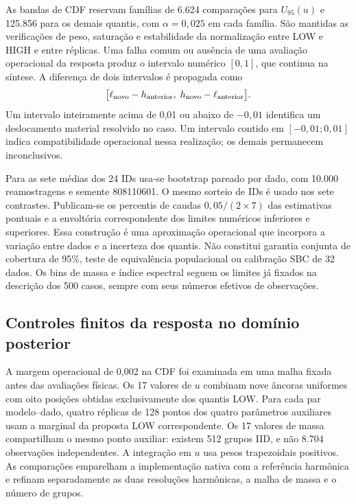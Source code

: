 As bandas de CDF reservam famílias de 6.624 comparações para $U_{95}(u)$ e
125.856 para os demais quantis, com $\alpha=0,025$ em cada família. São
mantidas as verificações de peso, saturação e estabilidade da normalização
entre LOW e HIGH e entre réplicas. Uma falha comum ou ausência de uma
avaliação operacional da resposta produz o intervalo numérico $[0,1]$,
que continua na síntese. A diferença de dois intervalos é propagada como
\begin{equation}
 \bigl[\ell_{\rm novo}-h_{\rm anterior},\;
  h_{\rm novo}-\ell_{\rm anterior}\bigr].
\end{equation}
Um intervalo inteiramente acima de 0,01 ou abaixo de $-0,01$ identifica
um deslocamento material resolvido no caso. Um intervalo contido em
$[-0,01;0,01]$ indica compatibilidade operacional nessa realização;
os demais permanecem inconclusivos.

Para as sete médias dos 24 IDs usa-se bootstrap pareado por dado, com
10.000 reamostragens e semente 808110601. O mesmo sorteio de IDs é usado
nos sete contrastes. Publicam-se os percentis de caudas $0,05/(2\times7)$
das estimativas pontuais e a envoltória correspondente dos limites
numéricos inferiores e superiores. Essa construção é uma aproximação
operacional que incorpora a variação entre dados e a incerteza dos
quantis. Não constitui garantia conjunta de cobertura de 95\%, teste de
equivalência populacional ou calibração SBC de 32 dados. Os bins de massa
e índice espectral seguem os limites já fixados na descrição dos 500
casos, sempre com seus números efetivos de observações.

\subsection{Controles finitos da resposta no domínio posterior}
\label{sec:comp-controles-finitos}

A margem operacional de 0,002 na CDF foi examinada em uma malha fixada
antes das avaliações físicas. Os 17 valores de $u$ combinam nove âncoras
uniformes com oito posições obtidas exclusivamente dos quantis LOW.
Para cada par modelo--dado, quatro réplicas de 128 pontos dos quatro
parâmetros auxiliares usam a marginal da proposta LOW correspondente.
Os 17 valores de massa compartilham o mesmo ponto auxiliar: existem
512 grupos IID, e não 8.704 observações independentes. A integração em
$u$ usa pesos trapezoidais positivos. As comparações emparelham a
implementação nativa com a referência harmônica e refinam separadamente
as duas resoluções harmônicas, a malha de massa e o número de grupos.

